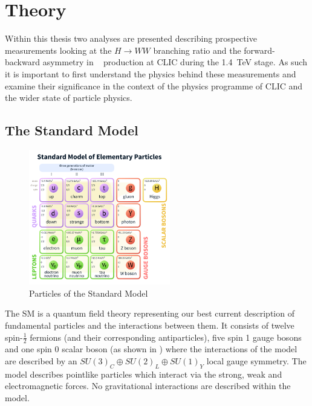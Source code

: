 \chapter{Theory}

Within this thesis two analyses are presented describing prospective measurements looking at the $H\rightarrow WW$ branching ratio and the forward-backward asymmetry in \ttbar~ production at CLIC during the 1.4~TeV stage. As such it is important to first understand the physics behind these measurements and examine their significance in the context of the physics programme of CLIC and the wider state of particle physics.


\section{The Standard Model}

\begin{figure}
  \centering
  \includegraphics[width=0.55\textwidth,keepaspectratio]{Theory/fig/smparticles.png}
  \caption[Particles of the Standard Model]{Particles of the Standard Model \cite{wiki:xxx}}
  \label{fig:smparticles}
\end{figure}

The \ac{SM} is a quantum field theory representing our best current description of fundamental particles and the interactions between them. It consists of twelve spin-$\frac{1}{2}$ fermions (and their corresponding antiparticles), five spin 1 gauge bosons and one spin 0 scalar boson (as shown in ) where the interactions of the model are described by an $SU(3)_{C}\oplus SU(2)_{L}\oplus SU(1)_{Y}$ local gauge symmetry. The model describes pointlike particles which interact via the strong, weak and electromagnetic forces. No gravitational interactions are described within the model.

